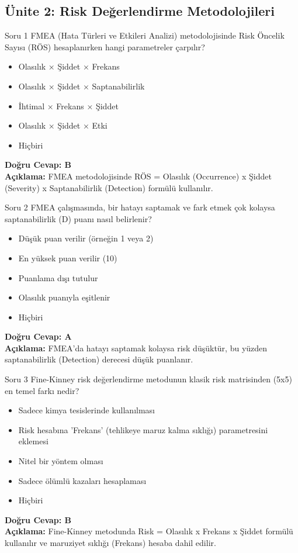 \documentclass[12pt,a4paper]{article}
\begin{document}
\subsection{Ünite 2: Risk Değerlendirme Metodolojileri}
\begin{testcard}{Soru 1}
    FMEA (Hata Türleri ve Etkileri Analizi) metodolojisinde Risk Öncelik Sayısı (RÖS) hesaplanırken hangi parametreler çarpılır?
    \begin{itemize}
        \item[A)] Olasılık × Şiddet × Frekans
        \item[B)] Olasılık × Şiddet × Saptanabilirlik
        \item[C)] İhtimal × Frekans × Şiddet
        \item[D)] Olasılık × Şiddet × Etki
        \item[E)] Hiçbiri
    \end{itemize}
    \tcblower
    \textbf{Doğru Cevap: B} \\
    \textbf{Açıklama:} FMEA metodolojisinde RÖS = Olasılık (Occurrence) x Şiddet (Severity) x Saptanabilirlik (Detection) formülü kullanılır.
\end{testcard}

\begin{testcard}{Soru 2}
    FMEA çalışmasında, bir hatayı saptamak ve fark etmek çok kolaysa saptanabilirlik (D) puanı nasıl belirlenir?
    \begin{itemize}
        \item[A)] Düşük puan verilir (örneğin 1 veya 2)
        \item[B)] En yüksek puan verilir (10)
        \item[C)] Puanlama dışı tutulur
        \item[D)] Olasılık puanıyla eşitlenir
        \item[E)] Hiçbiri
    \end{itemize}
    \tcblower
    \textbf{Doğru Cevap: A} \\
    \textbf{Açıklama:} FMEA'da hatayı saptamak kolaysa risk düşüktür, bu yüzden saptanabilirlik (Detection) derecesi düşük puanlanır.
\end{testcard}

\begin{testcard}{Soru 3}
    Fine-Kinney risk değerlendirme metodunun klasik risk matrisinden (5x5) en temel farkı nedir?
    \begin{itemize}
        \item[A)] Sadece kimya tesislerinde kullanılması
        \item[B)] Risk hesabına 'Frekans' (tehlikeye maruz kalma sıklığı) parametresini eklemesi
        \item[C)] Nitel bir yöntem olması
        \item[D)] Sadece ölümlü kazaları hesaplaması
        \item[E)] Hiçbiri
    \end{itemize}
    \tcblower
    \textbf{Doğru Cevap: B} \\
    \textbf{Açıklama:} Fine-Kinney metodunda Risk = Olasılık x Frekans x Şiddet formülü kullanılır ve maruziyet sıklığı (Frekans) hesaba dahil edilir.
\end{testcard}
\end{document}
